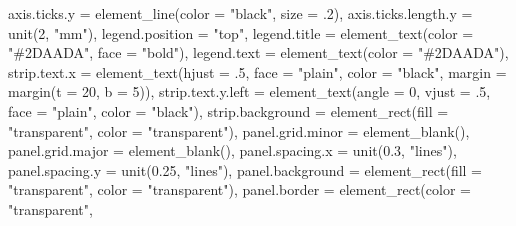 \documentclass[
]{book}
\newenvironment{Shaded}{\begin{snugshade}}{\end{snugshade}}
\newcommand{\AttributeTok}[1]{\textcolor[rgb]{0.77,0.63,0.00}{#1}}
\newcommand{\DecValTok}[1]{\textcolor[rgb]{0.00,0.00,0.81}{#1}}
\newcommand{\FloatTok}[1]{\textcolor[rgb]{0.00,0.00,0.81}{#1}}
\newcommand{\FunctionTok}[1]{\textcolor[rgb]{0.00,0.00,0.00}{#1}}
\newcommand{\NormalTok}[1]{#1}
\newcommand{\StringTok}[1]{\textcolor[rgb]{0.31,0.60,0.02}{#1}}
\begin{document}
\begin{Shaded}
\begin{Highlighting}[]
    \AttributeTok{axis.ticks.y =} \FunctionTok{element\_line}\NormalTok{(}\AttributeTok{color =} \StringTok{"black"}\NormalTok{, }
                                \AttributeTok{size =}\NormalTok{ .}\DecValTok{2}\NormalTok{),}
    \AttributeTok{axis.ticks.length.y =} \FunctionTok{unit}\NormalTok{(}\DecValTok{2}\NormalTok{, }\StringTok{"mm"}\NormalTok{),}
    \AttributeTok{legend.position =} \StringTok{"top"}\NormalTok{,}
    \AttributeTok{legend.title =} \FunctionTok{element\_text}\NormalTok{(}\AttributeTok{color =} \StringTok{"\#2DAADA"}\NormalTok{, }
                                \AttributeTok{face =} \StringTok{"bold"}\NormalTok{),}
    \AttributeTok{legend.text =} \FunctionTok{element\_text}\NormalTok{(}\AttributeTok{color =} \StringTok{"\#2DAADA"}\NormalTok{),}
    \AttributeTok{strip.text.x =} \FunctionTok{element\_text}\NormalTok{(}\AttributeTok{hjust =}\NormalTok{ .}\DecValTok{5}\NormalTok{, }
                                \AttributeTok{face =} \StringTok{"plain"}\NormalTok{, }
                                \AttributeTok{color =} \StringTok{"black"}\NormalTok{, }
                                \AttributeTok{margin =} \FunctionTok{margin}\NormalTok{(}\AttributeTok{t =} \DecValTok{20}\NormalTok{, }\AttributeTok{b =} \DecValTok{5}\NormalTok{)),}
    \AttributeTok{strip.text.y.left =} \FunctionTok{element\_text}\NormalTok{(}\AttributeTok{angle =} \DecValTok{0}\NormalTok{, }
                                     \AttributeTok{vjust =}\NormalTok{ .}\DecValTok{5}\NormalTok{, }
                                     \AttributeTok{face =} \StringTok{"plain"}\NormalTok{, }
                                     \AttributeTok{color =} \StringTok{"black"}\NormalTok{),}
    \AttributeTok{strip.background =} \FunctionTok{element\_rect}\NormalTok{(}\AttributeTok{fill =} \StringTok{"transparent"}\NormalTok{, }
                                    \AttributeTok{color =} \StringTok{"transparent"}\NormalTok{),}
    \AttributeTok{panel.grid.minor =} \FunctionTok{element\_blank}\NormalTok{(),}
    \AttributeTok{panel.grid.major =} \FunctionTok{element\_blank}\NormalTok{(),}
    \AttributeTok{panel.spacing.x =} \FunctionTok{unit}\NormalTok{(}\FloatTok{0.3}\NormalTok{, }\StringTok{"lines"}\NormalTok{),}
    \AttributeTok{panel.spacing.y =} \FunctionTok{unit}\NormalTok{(}\FloatTok{0.25}\NormalTok{, }\StringTok{"lines"}\NormalTok{),}
    \AttributeTok{panel.background =} \FunctionTok{element\_rect}\NormalTok{(}\AttributeTok{fill =} \StringTok{"transparent"}\NormalTok{, }
                                    \AttributeTok{color =} \StringTok{"transparent"}\NormalTok{),}
    \AttributeTok{panel.border =} \FunctionTok{element\_rect}\NormalTok{(}\AttributeTok{color =} \StringTok{"transparent"}\NormalTok{, }

\end{Highlighting}
\end{Shaded}
\end{document}
